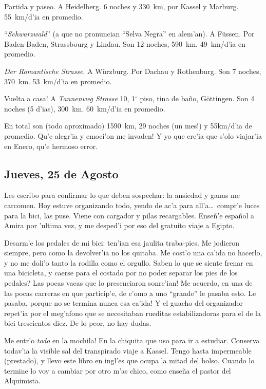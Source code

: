 \begin{description} \item Partida y paseo. A Heidelberg. 6 noches y 330~km, por
Kassel y Marburg. 55~km/d'ia en promedio. \item ``\emph{Schwarzwald}'' (a que no
pronuncian ``Selva Negra'' en alem'an). A F\"ussen. Por Baden-Baden, Strassbourg
y Lindau. Son 12 noches, 590~km. 49~km/d'ia en promedio. \item \emph{Der
Romantische Strasse}. A W\"urzburg. Por Dachau y Rothenburg. Son 7 noches,
370~km. 53~km/d'ia en promedio. \item \textexclamdown Vuelta a casa! A
\emph{Tannenweg Strasse} 10, 1$^{\circ}$ piso, tina de ba\~no, G\"ottingen. Son
4 noches (5 d'ias), 300~km. 60~km/d'ia en promedio. \end{description}

En total son (todo aproximado) 1590~km, 29 noches (\textexclamdown un mes!) y
55km/d'ia de promedio. \textexclamdown Qu'e alegr'ia y emoci'on me invaden! Y yo
que cre'ia que s'olo viajar'ia en Enero, qu'e hermoso error.

\subsection*{Jueves, 25 de Agosto}

Les escribo para confirmar lo que deben sospechar: la ansiedad y ganas me
carcomen. Hoy estuve organizando todo, yendo de ac'a para all'a\ldots\ compr'e
luces para la bici, las puse. Viene con cargador y pilas recargables. Ense\~n'e
espa\~nol a Amira por 'ultima vez, y me desped'i por eso del gratuito viaje a
Egipto.

Desarm'e los pedales de mi bici: ten'ian esa jaulita traba-pies. Me jodieron
siempre, pero como la devolver'ia no los quitaba. Me cost'o una ca'ida no
hacerlo, y no me doli'o tanto la rodilla como el orgullo. \textquestiondown
Saben lo que se siente frenar en una bicicleta, y caerse para el costado por no
poder separar los pies de los pedales? \textexclamdown Las pocas vacas que lo
presenciaron sonre'ian! Me acuerdo, en una de las pocas carreras en que
particip'e, de c'omo a uno ``grande'' le pasaba esto. \textexclamdown Le pasaba,
porque no se termina nunca esa ca'ida! Y el guacho del organizador repet'ia por
el meg'afono que se necesitaban rueditas estabilizadoras para el de la bici
trescientos diez. De lo peor, no hay dudas.

\textexclamdown Me entr'o \emph{todo} en la mochila! En la chiquita que uso para
ir a estudiar. Conserva todav'ia la visible sal del transpirado viaje a Kassel.
Tengo hasta impermeable (prestado), y llevo este libro en ingl'es que ocupa la
mitad del bolso. Cuando lo termine lo voy a cambiar por otro m'as chico, como
ense\~na el pastor del Alquimista.

